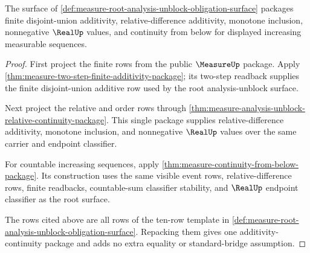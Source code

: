 \begin{theorem}
\label{thm:measure-root-analysis-unblock-additivity-continuity}
The surface of
\autoref{def:measure-root-analysis-unblock-obligation-surface} packages
finite disjoint-union additivity, relative-difference additivity, monotone
inclusion, nonnegative $\RealUp$ values, and continuity from below for
displayed increasing measurable sequences.
\end{theorem}
\begin{proof}
First project the finite rows from the public $\MeasureUp$ package. Apply
\autoref{thm:measure-two-step-finite-additivity-package}; its two-step
readback supplies the finite disjoint-union additive row used by the root
analysis-unblock surface.

Next project the relative and order rows through
\autoref{thm:measure-analysis-unblock-relative-continuity-package}. This
single package supplies relative-difference additivity, monotone inclusion,
and nonnegative $\RealUp$ values over the same carrier and endpoint
classifier.

For countable increasing sequences, apply
\autoref{thm:measure-continuity-from-below-package}. Its construction uses
the same visible event rows, relative-difference rows, finite readbacks,
countable-sum classifier stability, and $\RealUp$ endpoint classifier as the
root surface.

The rows cited above are all rows of the ten-row template in
\autoref{def:measure-root-analysis-unblock-obligation-surface}. Repacking
them gives one additivity-continuity package and adds no extra equality or
standard-bridge assumption.
\end{proof}

